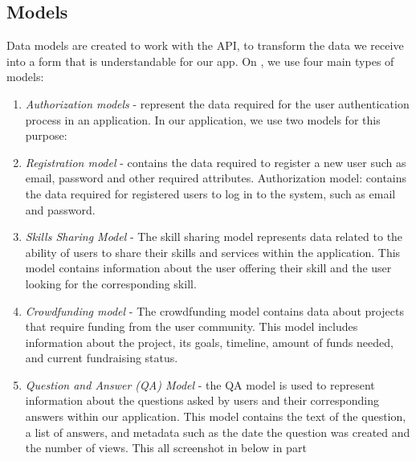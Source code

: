 \subsection{Models}\label{modls}
\hspace*{1cm} Data models are created to work with the API, to transform the data we receive into a form that is understandable for our app. On , we use four main types of models:
\begin{enumerate}
    \item \textit{Authorization models} - represent the data required for the user authentication process in an application. In our application, we use two models for this purpose: 
    \item \textit{Registration model} - contains the data required to register a new user such as email, password and other required attributes. Authorization model: contains the data required for registered users to log in to the system, such as email and password.
    \item \textit{Skills Sharing Model} -  The skill sharing model represents data related to the ability of users to share their skills and services within the application. This model contains information about the user offering their skill and the user looking for the corresponding skill.
    \item \textit{Crowdfunding model} - The crowdfunding model contains data about projects that require funding from the user community. This model includes information about the project, its goals, timeline, amount of funds needed, and current fundraising status.
    \item \textit{Question and Answer (QA) Model} - the QA model is used to represent information about the questions asked by users and their corresponding answers within our application. This model contains the text of the question, a list of answers, and metadata such as the date the question was created and the number of views. This all screenshot in below in  part
\end{enumerate}

